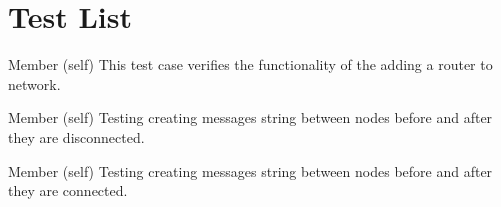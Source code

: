 \chapter{Test List}
\hypertarget{test}{}\label{test}

\begin{DoxyRefList}
\item[Member \doxylink{classtest__dvr_1_1_test_distance_vector_network_ac063b0552c86373776006054b428f2c0}{test\+\_\+dvr.Test\+Distance\+Vector\+Network.test\+\_\+add\+\_\+router} (self)]\label{test__test000003}%
%
This test case verifies the functionality of the adding a router to network.  
\item[Member \doxylink{classtest__dvr_1_1_test_distance_vector_network_a8c9e66bc6b0c9066cfa4942c89019db0}{test\+\_\+dvr.Test\+Distance\+Vector\+Network.test\+\_\+connected\+\_\+to\+\_\+disconnected} (self)]\label{test__test000008}%
%
Testing creating messages string between nodes before and after they are disconnected.  
\item[Member \doxylink{classtest__dvr_1_1_test_distance_vector_network_a01f7f76f88caa97537038082c535583c}{test\+\_\+dvr.Test\+Distance\+Vector\+Network.test\+\_\+disconnected\+\_\+to\+\_\+connected\+\_\+messages} (self)]\label{test__test000007}%
%
Testing creating messages string between nodes before and after they are connected. ~\newline
  

\end{DoxyRefList}
